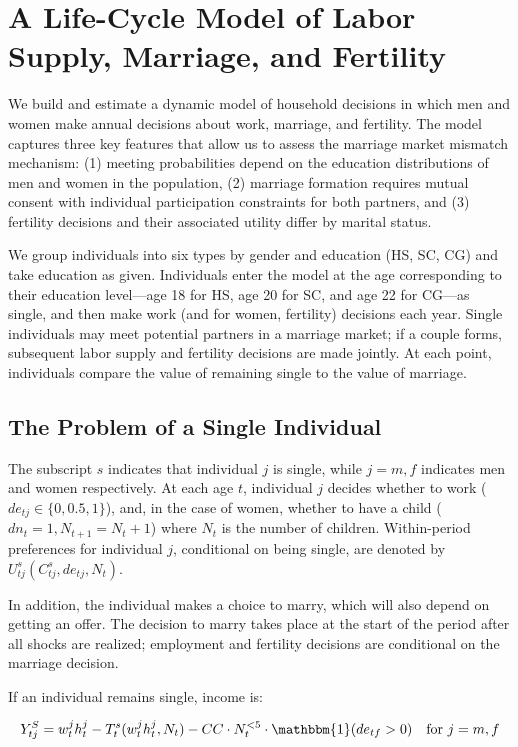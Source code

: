 \documentclass[12pt]{article}
\begin{document}
\section{A Life-Cycle Model of Labor Supply, Marriage, and Fertility} \label{sec:model}

We build and estimate a dynamic model of household decisions in which men and women make annual decisions about work, marriage, and fertility. The model captures three key features that allow us to assess the marriage market mismatch mechanism: (1) meeting probabilities depend on the education distributions of men and women in the population, (2) marriage formation requires mutual consent with individual participation constraints for both partners, and (3) fertility decisions and their associated utility differ by marital status.

We group individuals into six types by gender and education (HS, SC, CG) and take education as given. Individuals enter the model at the age corresponding to their education level---age 18 for HS, age 20 for SC, and age 22 for CG---as single, and then make work (and for women, fertility) decisions each year. Single individuals may meet potential partners in a marriage market; if a couple forms, subsequent labor supply and fertility decisions are made jointly. At each point, individuals compare the value of remaining single to the value of marriage.

\subsection{The Problem of a Single Individual}

The subscript $s$ indicates that individual $j$ is single, while $j = m, f$ indicates men and women respectively. At each age $t$, individual $j$ decides whether to work ($de_{tj} \in \{0, 0.5, 1\}$), and, in the case of women, whether to have a child ($dn_t = 1, N_{t+1} = N_t + 1$) where $N_t$ is the number of children. Within-period preferences for individual $j$, conditional on being single, are denoted by $U_{tj}^s(C_{tj}^s, de_{tj}, N_t)$.

In addition, the individual makes a choice to marry, which will also depend on getting an offer. The decision to marry takes place at the start of the period after all shocks are realized; employment and fertility decisions are conditional on the marriage decision.

If an individual remains single, income is:

\begin{equation}
Y_{tj}^S = w_t^j h_t^j - T_t^s(w_t^j h_t^j, N_t) - CC \cdot N_t^{<5} \cdot \mathbbm{1}(de_{tf} > 0) \quad \text{for } j = m, f
\label{eq:single_income}
\end{equation}
\end{document}
